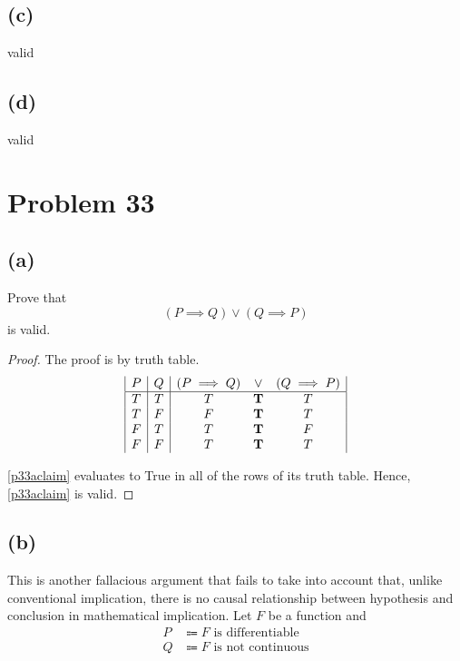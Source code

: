 \documentclass{article}
\begin{document}
\subsection{(c)}
valid

\subsection{(d)}
valid

\pagebreak

\section{Problem 33}
\subsection{(a)}
Prove that
\begin{equation}\label{p33aclaim}
	(P \implies Q) \lor (Q \implies P)
\end{equation}
is valid.
\begin{proof}
	The proof is by truth table.
	\[
		\begin{array}{|c|c|c c c|}
			P & Q & (P \implies Q) & \lor       & (Q \implies P) \\
			\hline
			T & T & T              & \mathbf{T} & T              \\
			T & F & F              & \mathbf{T} & T              \\
			F & T & T              & \mathbf{T} & F              \\
			F & F & T              & \mathbf{T} & T
		\end{array}
	\]

	\eqref{p33aclaim} evaluates to True in all of the rows of its truth table. Hence, \eqref{p33aclaim} is valid.
\end{proof}

\subsection{(b)}
This is another fallacious argument that fails to take into account that, unlike conventional implication, there is no causal relationship between hypothesis and conclusion in mathematical implication. Let $F$ be a function and
\begin{align*}
	P & \Coloneqq F \text{ is differentiable} \\
	Q & \Coloneqq F \text{ is not continuous}
\end{align*}
\end{document}
